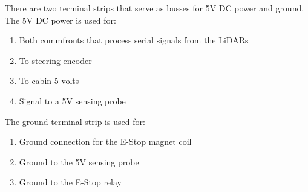 There are two terminal strips that serve as busses for 5V DC power and ground.  The 5V DC power is used for:

\begin{enumerate}
\item Both commfronts that process serial signals from the LiDARs
\item To steering encoder
\item To cabin 5 volts
\item Signal to a 5V sensing probe
\end{enumerate}

\noindent The ground terminal strip is used for:

\begin{enumerate}
\item Ground connection for the E-Stop magnet coil
\item Ground to the 5V sensing probe
\item Ground to the E-Stop relay
\end{enumerate}